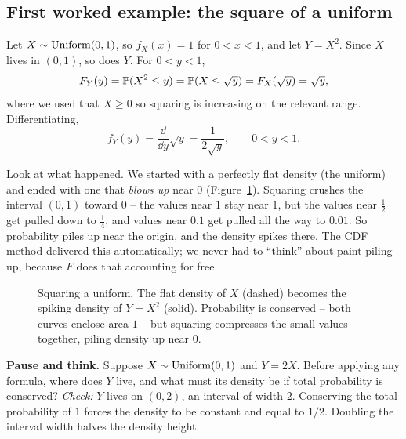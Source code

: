 \subsection{First worked example: the square of a uniform}

\begin{example}[$Y=X^2$ for a uniform]
\label{ch16:unif-square}
Let $X \sim \Unif(0,1)$, so $f_X(x) = 1$ for $0 < x < 1$, and let $Y = X^2$. Since $X$
lives in $(0,1)$, so does $Y$. For $0 < y < 1$,
\[
  F_Y(y) = \P(X^2 \le y) = \P(X \le \sqrt{y}) = F_X(\sqrt{y}) = \sqrt{y},
\]
where we used that $X \ge 0$ so squaring is increasing on the relevant range.
Differentiating,
\[
  f_Y(y) = \frac{\dd}{\dd y}\sqrt{y} = \frac{1}{2\sqrt{y}}, \qquad 0 < y < 1.
\]
\end{example}

Look at what happened. We started with a perfectly flat density (the
uniform) and ended with one that \emph{blows up} near $0$ (Figure~\ref{ch16:fig-square}).
Squaring crushes the interval $(0,1)$ toward $0$ -- the values near $1$ stay near $1$, but
the values near $\tfrac12$ get pulled down to $\tfrac14$, and values near $0.1$ get pulled
all the way to $0.01$. So probability piles up near the origin, and the density spikes
there. The CDF method delivered this automatically; we never had to ``think'' about
paint piling up, because $F$ does that accounting for free.

\begin{figure}[H]
\centering
{}
\caption{Squaring a uniform. The flat density of $X$ (dashed) becomes the spiking density
of $Y=X^2$ (solid). Probability is conserved -- both curves enclose area $1$ -- but
squaring compresses the small values together, piling density up near $0$.}
\label{ch16:fig-square}
\end{figure}

\begin{recoverybox}
\textbf{Pause and think.} Suppose $X \sim \Unif(0, 1)$ and $Y = 2X$. Before applying any
formula, where does $Y$ live, and what must its density be if total probability is conserved?
\emph{Check:} $Y$ lives on $(0, 2)$, an interval of width $2$. Conserving the total probability
of $1$ forces the density to be constant and equal to $1/2$. Doubling the interval width halves
the density height.
\end{recoverybox}

